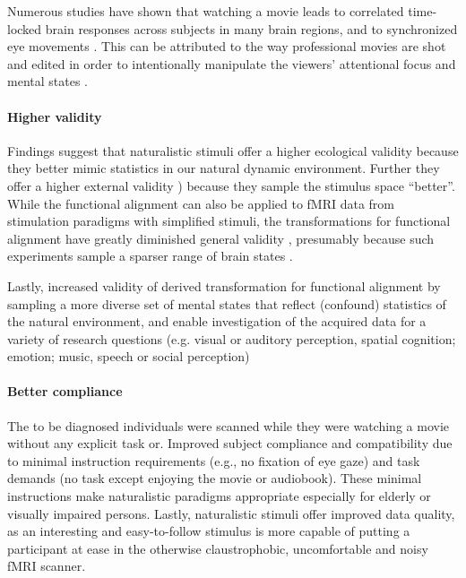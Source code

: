 %
Numerous studies have shown that watching a movie leads to correlated
time-locked brain responses across subjects in many brain regions, and to
synchronized eye movements \citep{hasson2010reliability, lankinen2014isc-meg}.
%
This can be attributed to the way professional movies are shot and edited in
order to intentionally manipulate the viewers' attentional focus and mental
states \citep{brown2012cinematography, dancyger2011film-technique}.


\paragraph{Higher validity}
%
Findings suggest that naturalistic stimuli offer a higher ecological validity
\citep{hasson2004intersubject} because they better mimic statistics in our
natural dynamic environment.
%
Further they offer a higher external validity \citep{westfall2016fixing})
because they sample the stimulus space ``better''.
%
While the functional alignment can also be applied to fMRI data from stimulation
paradigms with simplified stimuli, the transformations for functional alignment
have greatly diminished general validity \citep{haxby2011common}, presumably
because such experiments sample a sparser range of brain states
\citep{guntupalli2016model}.

%
Lastly, increased validity of derived transformation for functional alignment by
sampling a more diverse set of mental states that reflect (confound) statistics
of the natural environment, and enable investigation of the acquired data for a
variety of research questions (e.g. visual or auditory perception, spatial
cognition; emotion; music, speech or social perception)


\paragraph{Better compliance}

%
The to be diagnosed individuals were scanned while they were watching a movie
without any explicit task or.
%
Improved subject compliance and compatibility due to minimal instruction
requirements (e.g., no fixation of eye gaze) and task demands (no task except
enjoying the movie or audiobook).
%
These minimal instructions make naturalistic paradigms appropriate especially
for elderly or visually impaired persons.
%
Lastly, naturalistic stimuli offer improved data quality, as an interesting and
easy-to-follow stimulus is more capable of putting a participant at ease in the
otherwise claustrophobic, uncomfortable and noisy fMRI scanner.


